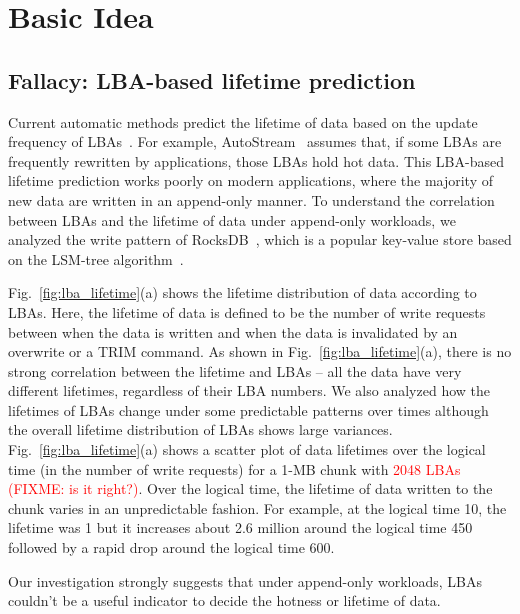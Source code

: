 \section{Basic Idea}
\subsection{Fallacy: LBA-based lifetime prediction}

Current automatic methods predict the lifetime of data based on the update
frequency of LBAs~\cite{AutoStream}.  
For example, AutoStream~\cite{AutoStream} assumes that, if
some LBAs are frequently rewritten by applications, those LBAs hold hot data.
This LBA-based lifetime prediction works poorly on modern applications, where
the majority of new data are written in an append-only manner.  To understand
the correlation between LBAs and the lifetime of data under append-only
workloads, we analyzed the write pattern of RocksDB~\cite{RocksDB}, which is a
popular key-value store based on the LSM-tree algorithm~\cite{LSM}.

Fig.~\ref{fig:lba_lifetime}(a) shows the lifetime distribution of data
according to LBAs. Here, the lifetime of data is defined to be 
the number of write requests between when the data is written 
and when the data is invalidated by an overwrite or a TRIM command. 
As shown in
Fig.~\ref{fig:lba_lifetime}(a), there is no strong correlation between the
lifetime and LBAs -- all the data have very different lifetimes, regardless of
their LBA numbers. We also analyzed 
how the lifetimes of LBAs change under some predictable patterns over times 
although the overall lifetime distribution of LBAs shows large variances.
Fig.~\ref{fig:lba_lifetime}(a) shows a scatter plot of data lifetimes over the logical time 
(in the number of write requests) for a 1-MB chunk with \textcolor{red}{2048 LBAs (FIXME: is it right?)}. 
Over the logical time, the lifetime of data written to the chunk 
varies in an unpredictable fashion.  
For example, at the logical time 10, the lifetime was 1 but it increases about 
2.6 million around the logical time 450 
followed by a rapid drop around the logical time 600. 

Our investigation strongly suggests that  under append-only
workloads, LBAs couldn't be a useful 
indicator to decide
the hotness or lifetime of data.

